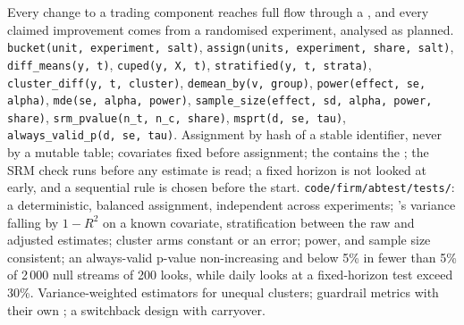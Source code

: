 \begin{build}
 Every change to a trading component reaches full flow through a , and every claimed improvement comes from a randomised
experiment, analysed as planned.
 \texttt{bucket(unit, experiment, salt)}, \texttt{assign(units, experiment, share, salt)}, \texttt{diff\_means(y, t)},
\texttt{cuped(y, X, t)}, \texttt{stratified(y, t, strata)}, \texttt{cluster\_diff(y, t, cluster)}, \texttt{demean\_by(v, group)},
\texttt{power(effect, se, alpha)}, \texttt{mde(se, alpha, power)}, \texttt{sample\_size(effect, sd, alpha, power, share)},
\texttt{srm\_pvalue(n\_t, n\_c, share)}, \texttt{msprt(d, se, tau)}, \texttt{always\_valid\_p(d, se, tau)}.
 Assignment by hash of a stable identifier, never by a mutable table; covariates fixed before assignment; the  contains the
; the SRM check runs before any estimate is read; a fixed horizon is not looked at early, and a sequential rule is chosen before the start.
 \texttt{code/firm/abtest/tests/}: a deterministic, balanced assignment, independent across experiments; 's variance falling by
$1-R^2$ on a known covariate, stratification between the raw and adjusted estimates; cluster arms constant or an error; power,  and
sample size consistent; an always-valid p-value non-increasing and below 5\% in fewer than 5\% of 2\,000 null streams of 200 looks, while daily looks at
a fixed-horizon test exceed 30\%.
 Variance-weighted estimators for unequal clusters; guardrail metrics with their own ; a switchback design with carryover.
\end{build}

